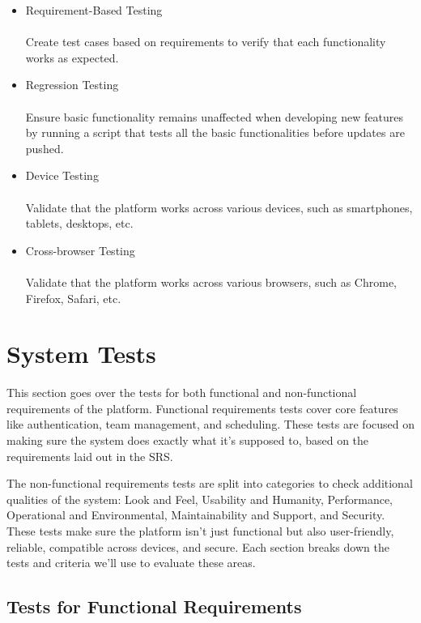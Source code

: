 \documentclass[12pt, titlepage]{article}
\begin{document}
\begin{itemize}
    \item Requirement-Based Testing
    \\ \\ Create test cases based on requirements to verify that each functionality works as expected.
    
    \item Regression Testing
    \\ \\ Ensure basic functionality remains unaffected when developing new features by running a script that tests all the basic functionalities before updates are pushed.

    \item Device Testing
    \\ \\ Validate that the platform works across various devices, such as smartphones, tablets, desktops, etc.

    \item Cross-browser Testing
    \\ \\ Validate that the platform works across various browsers,
    such as Chrome, Firefox, Safari, etc.
    
\end{itemize}

\section{System Tests}

This section goes over the tests for both functional and non-functional requirements of the platform. Functional requirements tests cover core features like authentication, team management, and scheduling. These tests are focused on making sure the system does exactly what it’s supposed to, based on the requirements laid out in the SRS.

The non-functional requirements tests are split into categories to check additional qualities of the system: Look and Feel, Usability and Humanity, Performance, Operational and Environmental, Maintainability and Support, and Security. These tests make sure the platform isn’t just functional but also user-friendly, reliable, compatible across devices, and secure. Each section breaks down the tests and criteria we’ll use to evaluate these areas.

\subsection{Tests for Functional Requirements}
\end{document}
